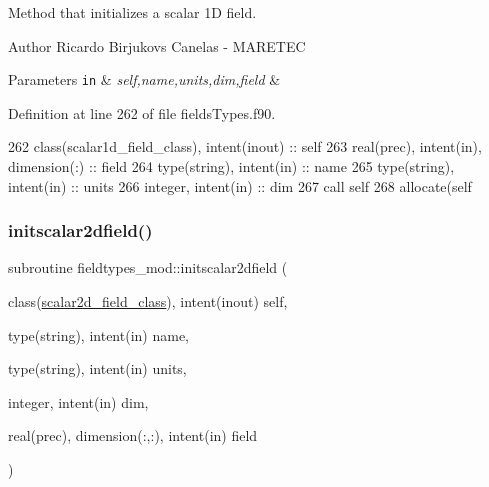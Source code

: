 Method that initializes a scalar 1D field. 

\begin{DoxyAuthor}{Author}
Ricardo Birjukovs Canelas -\/ M\+A\+R\+E\+T\+EC 
\end{DoxyAuthor}

\begin{DoxyParams}[1]{Parameters}
\mbox{\tt in}  & {\em self,name,units,dim,field} & \\
\hline
\end{DoxyParams}


Definition at line 262 of file fields\+Types.\+f90.


\begin{DoxyCode}
262     \textcolor{keywordtype}{class}(scalar1d\_field\_class), \textcolor{keywordtype}{intent(inout)} :: self
263     \textcolor{keywordtype}{real(prec)}, \textcolor{keywordtype}{intent(in)}, \textcolor{keywordtype}{dimension(:)} :: field
264     \textcolor{keywordtype}{type}(string), \textcolor{keywordtype}{intent(in)} :: name
265     \textcolor{keywordtype}{type}(string), \textcolor{keywordtype}{intent(in)} :: units
266     \textcolor{keywordtype}{integer}, \textcolor{keywordtype}{intent(in)} :: dim
267     \textcolor{keyword}{call }self%
268     \textcolor{keyword}{allocate}(self%
\end{DoxyCode}
\mbox{\label{namespacefieldtypes__mod_a1a3160727c99017639d758aad9031df5}} 
\subsubsection{\texorpdfstring{initscalar2dfield()}{initscalar2dfield()}}
{\footnotesize\ttfamily subroutine fieldtypes\+\_\+mod\+::initscalar2dfield (\begin{DoxyParamCaption}\item[{class(\mbox{\hyperlink{structfieldtypes__mod_1_1scalar2d__field__class}{scalar2d\+\_\+field\+\_\+class}}), intent(inout)}]{self,  }\item[{type(string), intent(in)}]{name,  }\item[{type(string), intent(in)}]{units,  }\item[{integer, intent(in)}]{dim,  }\item[{real(prec), dimension(\+:,\+:), intent(in)}]{field }\end{DoxyParamCaption})\hspace{0.3cm}{\ttfamily [private]}}



